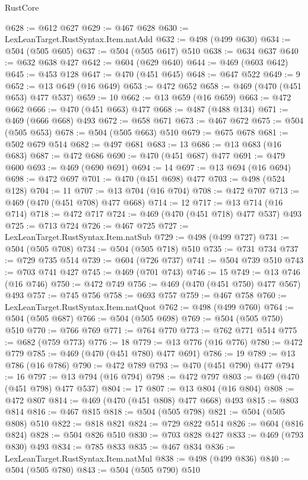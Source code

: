 \begin{lexlean}{RustCore}
\begin{coremodule}
@628 := @612 @627
@629 := @467 @628
@630 := LexLeanTarget.RustSyntax.Item.natAdd
@632 := @498 (@499 @630)
@634 := @504 (@505 @605)
@637 := @504 (@505 @617) @510
@638 := @634 @637
@640 := @632 @638 @427
@642 := @604 (@629 @640)
@644 := @469 (@603 @642)
@645 := @453 @128
@647 := @470 (@451 @645)
@648 := @647 @522
@649 := 9
@652 := @13 @649 (@16 @649)
@653 := @472 @652
@658 := @469 (@470 (@451 @653) @477 @537)
@659 := 10
@662 := @13 @659 (@16 @659)
@663 := @472 @662
@666 := @470 (@451 @663) @477
@668 := @487 (@488 @134)
@671 := @469 (@666 @668) @493
@672 := @658 @671
@673 := @467 @672
@675 := @504 (@505 @653)
@678 := @504 (@505 @663) @510
@679 := @675 @678
@681 := @502 @679 @514
@682 := @497 @681
@683 := 13
@686 := @13 @683 (@16 @683)
@687 := @472 @686
@690 := @470 (@451 @687) @477
@691 := @479 @600
@693 := @469 (@690 @691)
@694 := 14
@697 := @13 @694 (@16 @694)
@698 := @472 @697
@701 := @470 (@451 @698) @477
@703 := @498 (@524 @128)
@704 := 11
@707 := @13 @704 (@16 @704)
@708 := @472 @707
@713 := @469 (@470 (@451 @708) @477 @668)
@714 := 12
@717 := @13 @714 (@16 @714)
@718 := @472 @717
@724 := @469 (@470 (@451 @718) @477 @537) @493
@725 := @713 @724
@726 := @467 @725
@727 := LexLeanTarget.RustSyntax.Item.natSub
@729 := @498 (@499 @727)
@731 := @504 (@505 @708)
@734 := @504 (@505 @718) @510
@735 := @731 @734
@737 := @729 @735 @514
@739 := @604 (@726 @737)
@741 := @504 @739 @510
@743 := @703 @741 @427
@745 := @469 (@701 @743)
@746 := 15
@749 := @13 @746 (@16 @746)
@750 := @472 @749
@756 := @469 (@470 (@451 @750) @477 @567) @493
@757 := @745 @756
@758 := @693 @757
@759 := @467 @758
@760 := LexLeanTarget.RustSyntax.Item.natQuot
@762 := @498 (@499 @760)
@764 := @504 (@505 @687)
@766 := @504 (@505 @698)
@769 := @504 (@505 @750) @510
@770 := @766 @769
@771 := @764 @770
@773 := @762 @771 @514
@775 := @682 (@759 @773)
@776 := 18
@779 := @13 @776 (@16 @776)
@780 := @472 @779
@785 := @469 (@470 (@451 @780) @477 @691)
@786 := 19
@789 := @13 @786 (@16 @786)
@790 := @472 @789
@793 := @470 (@451 @790) @477
@794 := 16
@797 := @13 @794 (@16 @794)
@798 := @472 @797
@803 := @469 (@470 (@451 @798) @477 @537)
@804 := 17
@807 := @13 @804 (@16 @804)
@808 := @472 @807
@814 := @469 (@470 (@451 @808) @477 @668) @493
@815 := @803 @814
@816 := @467 @815
@818 := @504 (@505 @798)
@821 := @504 (@505 @808) @510
@822 := @818 @821
@824 := @729 @822 @514
@826 := @604 (@816 @824)
@828 := @504 @826 @510
@830 := @703 @828 @427
@833 := @469 (@793 @830) @493
@834 := @785 @833
@835 := @467 @834
@836 := LexLeanTarget.RustSyntax.Item.natMul
@838 := @498 (@499 @836)
@840 := @504 (@505 @780)
@843 := @504 (@505 @790) @510

\end{coremodule}
\end{lexlean}
